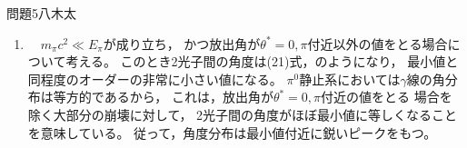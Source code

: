 \documentclass[fleqn]{jbook}
\def\ds{\displaystyle}
\newcommand{\no}{\nonumber \\}
\newcommand{\R}[1]{(\mathrm{#1})}
\newcommand{\sisuu}[1]{\times 10^{#1}}
\begin{document}
\begin{answer}{問題5}{八木太}
\begin{enumerate}
\begin{enumerate}
ただし，$\pi^0$のエネルギー$E_{\pi}=30~\R{GeV}$は，
$\pi^0$の静止エネルギー$m_{\pi}c^2=135~\R{MeV}$と比較して十分大きいと近似した。
一方，$y$方向の運動量については，ローレンツ変換の影響を受けないので，
\begin{equation}
p_y=\frac{m_{\pi}c}{2}\sin\theta^*
\end{equation}
である。このことから，実験室系での角度$\theta_1$を求めると，
\begin{equation}
\tan\theta_1
=\frac{p_y}{p_x}
=\frac{\ds \frac{m_{\pi}c}{2}\sin\theta^*}%
    {\ds \frac{E_{\pi}}{2c}\left( 1+\cos\theta^* \right)}
=\frac{m_{\pi}c^2}{E_{\gamma}} \frac{\sin\theta^*}{1+\cos\theta^*}
\end{equation}
である。
ただし，前述のように$m_{\pi}c^2\ll E_{\pi}$であるから，
少なくとも2光子の成す角を最小値にするような$\theta^*$に対しては，
$\tan\theta_1$の値は非常に小さく，
\begin{equation}
\theta_1
\simeq \tan\theta_1
= \frac{m_{\pi}c^2}{E_{\gamma}} \frac{\sin\theta^*}{1+\cos\theta^*}
\ilabel{theta1}
\end{equation}
と近似できる。
同様にしてもう一方の$\gamma$の角度$\theta_2$についても求めると，
\begin{equation}
\theta_2
\simeq  \frac{m_{\pi}c^2}{E_{\gamma}} \frac{\sin\theta^*}{1-\cos\theta^*}
\ilabel{theta2}
\end{equation}
となる。
2光子の成す角は，(19)式+(20)式，で計算できて，

\begin{eqnarray}
\theta_1+\theta_2
&=& \frac{m_{\pi}c^2}{E_{\gamma}} 
    \left( \frac{\sin\theta^*}{1+\cos\theta^*} 
    + \frac{\sin\theta^*}{1-\cos\theta^*} \right) \no
&=& \frac{m_{\pi}c^2}{E_{\gamma}} \frac{2}{\sin\theta^*}
\ilabel{答え} \\
&\ge& \frac{2m_{\pi}c^2}{E_{\gamma}} 
    \qquad \Big(等号成立は\theta^*=\frac{\pi}{2}の時\Big)\no
&=& \frac{2 \times 135~\R{MeV}}{30~\R{GeV}} \no
&=& 9.0\sisuu{-3}~\R{rad}
\end{eqnarray}
より，2光子間の角度の最小値が求まった。\\

    \item 　$m_{\pi}c^2\ll E_{\pi}$が成り立ち，
かつ放出角が$\theta^*=0,\pi$付近以外の値をとる場合について考える。
このとき2光子間の角度は(21)式，のようになり，
最小値と同程度のオーダーの非常に小さい値になる。
$\pi^0$静止系においては$\gamma$線の角分布は等方的であるから，
これは，放出角が$\theta^*=0,\pi$付近の値をとる
場合を除く大部分の崩壊に対して，
2光子間の角度がほぼ最小値に等しくなることを意味している。
従って，角度分布は最小値付近に鋭いピークをもつ。\\


\end{enumerate}
\end{enumerate}
\end{answer}
\end{document}
